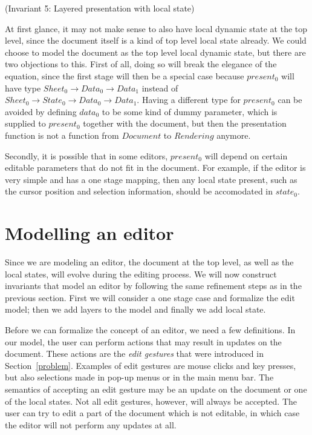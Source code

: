\documentclass[twoside,epsf]{report}
\begin{document}
{\centering (Invariant 5: Layered presentation with local state)\\}\vspace{1em}

At first glance, it may not make sense to also have local dynamic state at the top level, since the document itself is a kind of top level local state already. We could choose to model the document as the top level local dynamic state, but there are two objections to this. First of all, doing so will break the elegance of the equation, since the first stage will then be a special case because $present_0$ will have type $Sheet_0 \rightarrow Data_0 \rightarrow Data_1$ instead of $Sheet_0 \rightarrow State_0 \rightarrow Data_0 \rightarrow Data_1$. Having a different type for $present_0$ can be avoided by defining $data_0$ to be some kind of dummy parameter, which is supplied to $present_0$ together with the document, but then the presentation function is not a function from $Document$ to $Rendering$ anymore. 

Secondly, it is possible that in some editors, $present_0$ will depend on certain editable parameters that do not fit in the document. For example, if the editor is very simple and has a one stage mapping, then any local state present, such as the cursor position and selection information, should be accomodated in $state_0$.
\section{Modelling an editor}
\label{editing}

Since we are modeling an editor, the document at the top level, as well as the local states, will evolve during the editing process. We will now construct invariants that model an editor by following the same refinement steps as in the previous section. First we will consider a one stage case and formalize the edit model; then we add layers to the model and finally we add local state.

Before we can formalize the concept of an editor, we need a few definitions. In our model, the user can perform actions that may result in updates on the document. These actions are the {\em edit gestures} that were introduced in Section~\ref{problem}. Examples of edit gestures are mouse clicks and key presses, but also selections made in pop-up menus or in the main menu bar. The semantics of accepting an edit gesture may be an update on the document or one of the local states. Not all edit gestures, however, will always be accepted. The user can try to edit a part of the document which is not editable, in which case the editor will not perform any updates at all.
      
\end{document}
